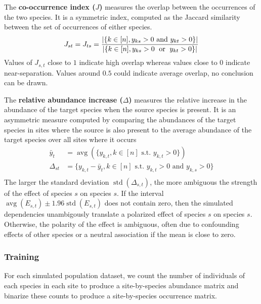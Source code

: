 \documentclass[]{article}
\newcommand{\abs}[1]{\left\lvert#1\right\rvert}
\newcommand{\site}{k}
\newcommand{\abdv}{y}
\DeclareMathOperator{\avg}{avg}
\DeclareMathOperator{\std}{std}
\begin{document}
The \textbf{co-occurrence index ($J$)} measures the overlap between the occurrences of the two species.
It is a symmetric index, computed as the Jaccard similarity between the set of occurrences of either species.
\begin{equation*}
J_{st} = J_{ts} = \dfrac{\abs{\{\site \in [n],  \abdv_{\site s} > 0 \text{ and } \abdv_{\site t} > 0\}}}{\abs{\{\site \in [n],  \abdv_{\site s} > 0 \text{ \;or\; } \abdv_{\site t} > 0\}}}
\end{equation*}
Values of $J_{s,t}$ close to $1$ indicate high overlap whereas values close to $0$ indicate near-separation. Values around $0.5$ could indicate average overlap, no conclusion can be drawn.  

The \textbf{relative abundance increase ($\Delta$)} measures the relative increase in the abundance of the target species when the source species is present. It is an asymmetric measure computed by comparing the abundances of the target species in sites where the source is also present to the average abundance of the target species over all sites where it occurs
\begin{align*}
  \bar{\abdv}_{t} & = \avg(\{ \abdv_{\site,t},  \site \in [n]\text{ s.t.\ }\abdv_{\site,t} >0\}) \\
  \Delta_{st} & = \{ \abdv_{\site,t} - \bar{\abdv}_{t},  \site \in [n]\text{ s.t.\ }\abdv_{\site,t} > 0 \text{ and } \abdv_{\site,s} > 0\} \\
\end{align*}
The larger the standard deviation $\std(\Delta_{s,t})$, the more ambiguous the strength of the effect of species $s$ on species $s$.
If the interval $\avg(E_{s,t}) \pm 1.96 \std(E_{s,t})$ does not contain zero, then the simulated dependencies unambigously translate a polarized effect of species $s$ on species $s$. Otherwise, the polarity of the effect is ambiguous, often due to confounding effects of other species or a neutral association if the mean is close to zero.

\subsubsection{Training}
For each simulated population dataset, we count the number of individuals of each species in each site to produce a site-by-species abundance matrix and binarize these counts to produce a site-by-species occurrence matrix. 
\end{document}
